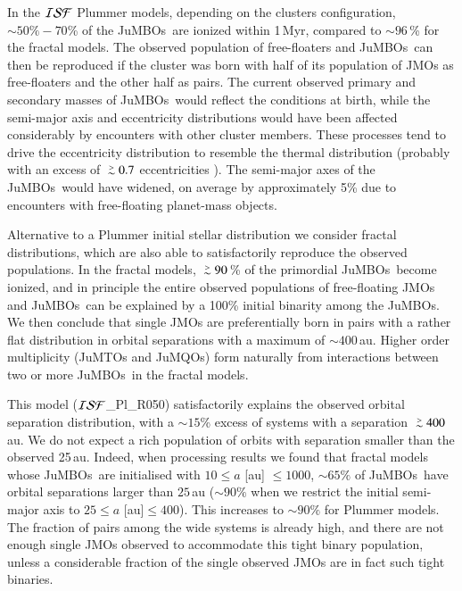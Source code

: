 \documentclass[submission,phys]{lib/SciPost}
\def\apgt{\ {\raise-.5ex\hbox{$\buildrel>\over\sim$}}\ }
\newcommand{\jumbos}{\mbox{JuMBOs}}
\begin{document}
In the ${\cal ISF}$ Plummer models, depending on the clusters configuration,
$\sim 50\%-70$\% of the \jumbos\, are ionized within 1\,Myr, compared to 
$\sim 96$\,\% for the fractal models.  The observed population of free-floaters and 
\jumbos\, can then be reproduced if the cluster was born with half of its population of JMOs
as free-floaters and the other half as pairs.  The current observed
primary and secondary masses of \jumbos\, would reflect the
conditions at birth, while the semi-major axis and eccentricity
distributions would have been affected considerably by encounters with
other cluster members. These processes tend to drive the eccentricity
distribution to resemble the thermal distribution (probably with an
excess of $\apgt 0.7$ eccentricities
\cite{2000IJoMP...15..4871P}). The semi-major axes of the \jumbos\ would
have widened, on average by approximately 5\% due to encounters with
free-floating planet-mass objects.

Alternative to a Plummer initial stellar distribution we consider
fractal distributions, which are also able to satisfactorily reproduce
the observed populations. In the fractal models, $\apgt 90$\,\% of the
primordial \jumbos\, become ionized, and in principle the entire
observed populations of free-floating JMOs and
\jumbos\, can be explained by a 100\% initial binarity among the
\jumbos. We then conclude that single JMOs are
preferentially born in pairs with a rather flat distribution in orbital
separations with a maximum of $\sim 400$\,au.  Higher order
multiplicity (JuMTOs and JuMQOs) form naturally from interactions between
two or more \jumbos\, in the fractal models.

This model (${\cal ISF}$\_Pl\_R050) satisfactorily explains the
observed orbital separation distribution, with a $\sim 15$\% excess of
systems with a separation $\apgt 400$\,au. We do not expect a rich
population of orbits with separation smaller than the observed
25\,au. Indeed, when processing results we found that fractal models
whose \jumbos\ are initialised with $10\leq a$ [au] $\leq 1000$,
$\sim65\%$ of \jumbos\ have orbital separations larger than $25$\,au
($\sim90\%$ when we restrict the initial semi-major axis to $25\leq a$
[au]$\leq 400$). This increases to $\sim 90\%$ for Plummer models.
The fraction of pairs among the wide systems is already high, and
there are not enough single JMOs observed to accommodate this tight
binary population, unless a considerable fraction of the single
observed JMOs are in fact such tight binaries.
\end{document}
